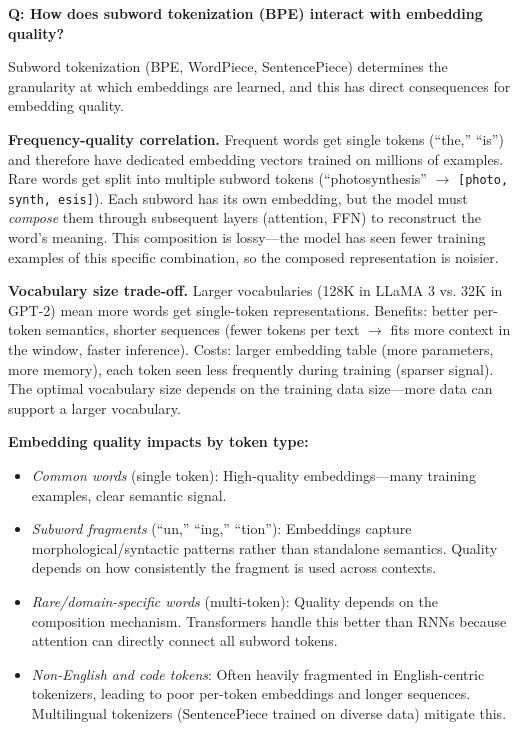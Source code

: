 
\begin{interviewq}
\textbf{Q: How does subword tokenization (BPE) interact with embedding quality?}

 \quad {} \quad \badgefreq{\freqhigh}

\stronganswer

Subword tokenization (BPE, WordPiece, SentencePiece) determines the granularity at which embeddings are learned, and this has direct consequences for embedding quality.

\textbf{Frequency-quality correlation.} Frequent words get single tokens (``the,'' ``is'') and therefore have dedicated embedding vectors trained on millions of examples. Rare words get split into multiple subword tokens (``photosynthesis'' $\to$ \texttt{[photo, synth, esis]}). Each subword has its own embedding, but the model must \textit{compose} them through subsequent layers (attention, FFN) to reconstruct the word's meaning. This composition is lossy---the model has seen fewer training examples of this specific combination, so the composed representation is noisier.

\textbf{Vocabulary size trade-off.} Larger vocabularies (128K in LLaMA 3 vs. 32K in GPT-2) mean more words get single-token representations. Benefits: better per-token semantics, shorter sequences (fewer tokens per text $\to$ fits more context in the window, faster inference). Costs: larger embedding table (more parameters, more memory), each token seen less frequently during training (sparser signal). The optimal vocabulary size depends on the training data size---more data can support a larger vocabulary.

\textbf{Embedding quality impacts by token type:}
\begin{itemize}
    \item \textit{Common words} (single token): High-quality embeddings---many training examples, clear semantic signal.
    \item \textit{Subword fragments} (``un,'' ``ing,'' ``tion''): Embeddings capture morphological/syntactic patterns rather than standalone semantics. Quality depends on how consistently the fragment is used across contexts.
    \item \textit{Rare/domain-specific words} (multi-token): Quality depends on the composition mechanism. Transformers handle this better than RNNs because attention can directly connect all subword tokens.
    \item \textit{Non-English and code tokens}: Often heavily fragmented in English-centric tokenizers, leading to poor per-token embeddings and longer sequences. Multilingual tokenizers (SentencePiece trained on diverse data) mitigate this.
\end{itemize}


\end{interviewq}
